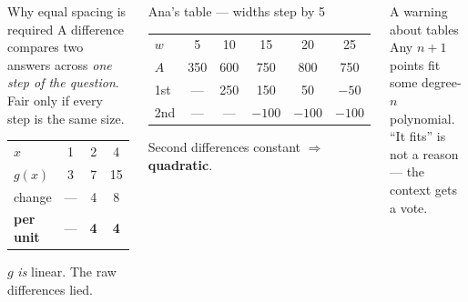 \documentclass[aspectratio=169, 11pt]{beamer}
\begin{document}
\begin{frame}[t, plain]

  \begin{columns}[T, onlytextwidth]
      \begin{block}{Why equal spacing is required}
        A difference compares two answers across \textit{one step of the
        question}. Fair only if every step is the same size.

        \smallskip
        \renewcommand{\arraystretch}{1.15}
        \begin{tabular}{@{}lccc@{}}
          \(x\)          & 1 & 2 & 4 \\
          \(g(x)\)       & 3 & 7 & 15 \\
          change         & --- & 4 & 8 \\
          \textbf{per unit} & --- & \textbf{4} & \textbf{4} \\
        \end{tabular}

        \smallskip
        \(g\) \textit{is} linear. The raw differences lied.
      \end{block}

      \begin{block}{Ana's table --- widths step by 5}
        \renewcommand{\arraystretch}{1.15}
        \begin{tabular}{@{}lccccc@{}}
          \(w\)  & 5 & 10 & 15 & 20 & 25 \\
          \(A\)  & 350 & 600 & 750 & 800 & 750 \\
          1st    & --- & 250 & 150 & 50 & \(-50\) \\
          2nd    & --- & --- & \(-100\) & \(-100\) & \(-100\) \\
        \end{tabular}

        \smallskip
        Second differences constant \(\Rightarrow\) \textbf{quadratic}.
      \end{block}

      \medskip
      \begin{block}{A warning about tables}
        Any \(n+1\) points fit some degree-\(n\) polynomial. ``It fits'' is not
        a reason --- the context gets a vote.
      \end{block}
  \end{columns}
\end{frame}
\end{document}
